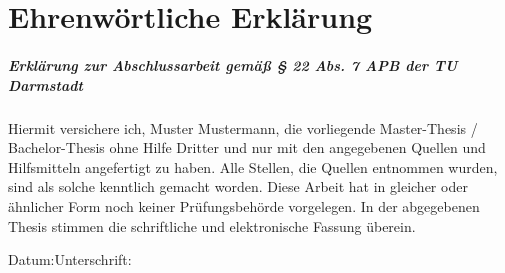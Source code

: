 	\chapter{Ehrenwörtliche Erklärung}
	\vspace{11pt}
	\paragraph{Erklärung zur Abschlussarbeit gemäß § 22 Abs. 7 APB der TU Darmstadt}
	\vspace{11pt}
	\noindent Hiermit versichere ich, Muster Mustermann, die vorliegende Master-Thesis / Bachelor-Thesis ohne Hilfe Dritter und nur mit den angegebenen Quellen und Hilfsmitteln angefertigt zu haben. Alle Stellen, die Quellen entnommen wurden, sind als solche kenntlich gemacht worden. Diese Arbeit hat in gleicher oder ähnlicher Form noch keiner Prüfungsbehörde vorgelegen. \newline
	In der abgegebenen Thesis stimmen die schriftliche und elektronische Fassung überein.\vspace{40pt}
	
	\noindent Datum:\hspace{0.4\textwidth}Unterschrift:
	\vspace*{2cm}	